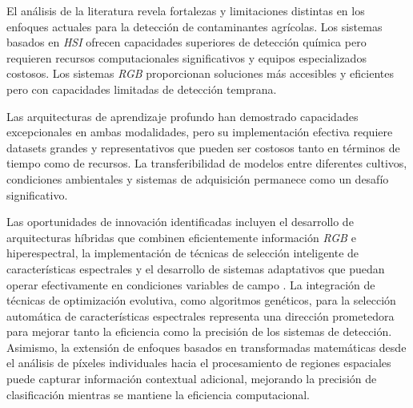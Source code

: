 \vspace{5mm}

El análisis de la literatura revela fortalezas y limitaciones distintas en los enfoques actuales para la detección de contaminantes agrícolas. Los sistemas basados en \emph{HSI} ofrecen capacidades superiores de detección química pero requieren recursos computacionales significativos y equipos especializados costosos. Los sistemas \emph{RGB} proporcionan soluciones más accesibles y eficientes pero con capacidades limitadas de detección temprana.

\vspace{5mm}

Las arquitecturas de aprendizaje profundo han demostrado capacidades excepcionales en ambas modalidades, pero su implementación efectiva requiere datasets grandes y representativos que pueden ser costosos tanto en términos de tiempo como de recursos. La transferibilidad de modelos entre diferentes cultivos, condiciones ambientales y sistemas de adquisición permanece como un desafío significativo.

\vspace{5mm}

Las oportunidades de innovación identificadas incluyen el desarrollo de arquitecturas híbridas que combinen eficientemente información \emph{RGB} e hiperespectral, la implementación de técnicas de selección inteligente de características espectrales y el desarrollo de sistemas adaptativos que puedan operar efectivamente en condiciones variables de campo \cite{WIEME2022156}. La integración de técnicas de optimización evolutiva, como algoritmos genéticos, para la selección automática de características espectrales representa una dirección prometedora para mejorar tanto la eficiencia como la precisión de los sistemas de detección. Asimismo, la extensión de enfoques basados en transformadas matemáticas desde el análisis de píxeles individuales hacia el procesamiento de regiones espaciales puede capturar información contextual adicional, mejorando la precisión de clasificación mientras se mantiene la eficiencia computacional.